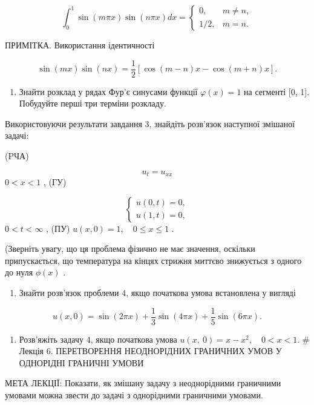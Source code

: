 \documentclass[
  ukrainian,
]{article}
\providecommand{\tightlist}{%
  \setlength{\itemsep}{0pt}\setlength{\parskip}{0pt}}
\begin{document}
\[\int_0^1 \sin(m\pi x) \sin(n\pi x) dx = \begin{cases} 0, & m \neq n, \\ 1/2, & m = n. \end{cases}\]

ПРИМІТКА. Використання ідентичності

\[\sin(mx)\sin(nx) = \frac{1}{2}[\cos(m-n)x - \cos(m+n)x].\]

\begin{enumerate}
\def\labelenumi{\arabic{enumi}.}
\setcounter{enumi}{2}
\tightlist
\item
  Знайти розклад у рядах Фур'є синусами функції \(\varphi(x) = 1\) на
  сегменті {[}0, 1{]}. Побудуйте перші три терміни розкладу.
\end{enumerate}

Використовуючи результати завдання 3, знайдіть розв'язок наступної
змішаної задачі:

(PЧА)

\[u_t = u_{xx}\] \(0 < x < 1\) , (ГУ)

\[\begin{cases} u(0, t) = 0, \\ u(1, t) = 0, \end{cases}\]
\(0 < t < \infty\) , (ПУ) \(u(x, 0) = 1, \quad 0 \le x \le 1\) .

(Зверніть увагу, що ця проблема фізично не має значення, оскільки
припускається, що температура на кінцях стрижня миттєво знижується з
одного до нуля \(\phi(x)\) .

\begin{enumerate}
\def\labelenumi{\arabic{enumi}.}
\setcounter{enumi}{4}
\tightlist
\item
  Знайти розв'язок проблеми 4, якщо початкова умова встановлена у
  вигляді
\end{enumerate}

\[u(x, 0) = \sin(2\pi x) + \frac{1}{3}\sin(4\pi x) + \frac{1}{5}\sin(6\pi x).\]

\begin{enumerate}
\def\labelenumi{\arabic{enumi}.}
\setcounter{enumi}{5}
\tightlist
\item
  Розв'яжіть задачу 4, якщо початкова умова
  \(u\left( x,\ 0\right) =x-x^{2},\quad 0< x<1.\) \# Лекція 6.
  ПЕРЕТВОРЕННЯ НЕОДНОРІДНИХ ГРАНИЧНИХ УМОВ У ОДНОРІДНІ ГРАНИЧНІ УМОВИ
\end{enumerate}

МЕТА ЛЕКЦІЇ: Показати, як змішану задачу з неоднорідними граничними
умовами можна звести до задачі з однорідними граничними умовами.
\end{document}
